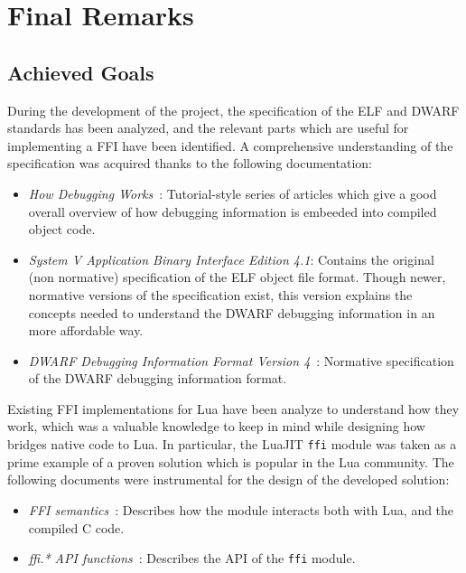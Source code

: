 \cleardoublepage

\chapter{Final Remarks}

\section{Achieved Goals}

During the development of the project, the specification of the ELF and DWARF
standards has been analyzed, and the relevant parts which are useful for
implementing a \gls{FFI} have been identified. A comprehensive understanding
of the specification was acquired thanks to the following documentation:

\begin{itemize}

	\item \emph{How Debugging Works}~\cite{howdebugworks}: Tutorial-style
	series of articles which give a good overall overview of how debugging
	information is embeeded into compiled object code.

	\item \emph{System V Application Binary Interface Edition
	4.1}\cite{elfspec-sysv}: Contains the original (non normative)
	  specification of the ELF object file format. Though newer, normative
	  versions of the specification exist, this version explains the concepts
	  needed to understand the DWARF debugging information in an more
	  affordable way.

	\item \emph{DWARF Debugging Information Format Version
	4}~\cite{dwarfspecv4}: Normative specification of the DWARF debugging
	  information format.

\end{itemize}

Existing FFI implementations for Lua have been analyze to understand how they
work, which was a valuable knowledge to keep in mind while designing how \Eol*
bridges native code to Lua. In particular, the LuaJIT \verb|ffi| module was
taken as a prime example of a proven solution which is popular in the Lua
community. The following documents were instrumental for the design of the
developed solution:

\begin{itemize}

	\item \emph{FFI semantics}~\cite{lj-ffi-semantic}: Describes how the
	module interacts both with Lua, and the compiled C code.

	\item \emph{ffi.* API functions}~\cite{lj-ffi-api}: Describes the API
	of the \verb|ffi| module.

\end{itemize}

